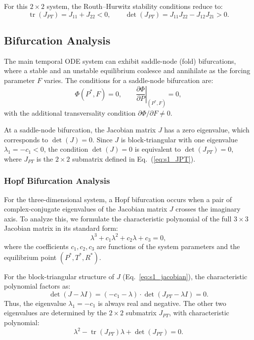\documentclass[12pt,a4paper]{article}
\DeclareMathOperator{\tr}{tr}
\begin{document}
For this $2\times 2$ system, the Routh--Hurwitz stability conditions reduce to:
\begin{equation}
	\tr(J_{PT}) = J_{11} + J_{22} < 0, \qquad \det(J_{PT}) = J_{11}J_{22} - J_{12}J_{21} > 0.
	\label{eq:s1_stability_conditions}
\end{equation}

\subsection{Bifurcation Analysis}

The main temporal ODE system can exhibit saddle-node (fold) bifurcations, where a stable and an unstable equilibrium coalesce and annihilate as the forcing parameter $F$ varies. The conditions for a saddle-node bifurcation are:
\begin{equation}
	\Phi(P^*, F) = 0, \qquad \left.\frac{\partial \Phi}{\partial P}\right|_{(P^*, F)} = 0,
	\label{eq:s1_fold_conditions}
\end{equation}
with the additional transversality condition $\partial \Phi/\partial F \neq 0$.

At a saddle-node bifurcation, the Jacobian matrix $J$ has a zero eigenvalue, which corresponds to $\det(J) = 0$. Since $J$ is block-triangular with one eigenvalue $\lambda_1 = -c_1 < 0$, the condition $\det(J) = 0$ is equivalent to $\det(J_{PT}) = 0$, where $J_{PT}$ is the $2\times 2$ submatrix defined in Eq.~(\ref{eq:s1_JPT}).

\subsubsection{Hopf Bifurcation Analysis}

For the three-dimensional system, a Hopf bifurcation occurs when a pair of complex-conjugate eigenvalues of the Jacobian matrix $J$ crosses the imaginary axis. To analyze this, we formulate the characteristic polynomial of the full $3\times 3$ Jacobian matrix in its standard form:
\begin{equation}
	\lambda^3 + c_1 \lambda^2 + c_2 \lambda + c_3 = 0,
	\label{eq:s1_char_poly_3d}
\end{equation}
where the coefficients $c_1, c_2, c_3$ are functions of the system parameters and the equilibrium point $(P^*, T^*, R^*)$.

For the block-triangular structure of $J$ (Eq.~\ref{eq:s1_jacobian}), the characteristic polynomial factors as:
\begin{equation}
	\det(J - \lambda I) = (-c_1 - \lambda) \cdot \det(J_{PT} - \lambda I) = 0.
	\label{eq:s1_char_poly_factor}
\end{equation}
Thus, the eigenvalue $\lambda_1 = -c_1$ is always real and negative. The other two eigenvalues are determined by the $2\times 2$ submatrix $J_{PT}$, with characteristic polynomial:
\begin{equation}
	\lambda^2 - \tr(J_{PT}) \lambda + \det(J_{PT}) = 0.
	\label{eq:s1_char_poly_2d}
\end{equation}
\end{document}
